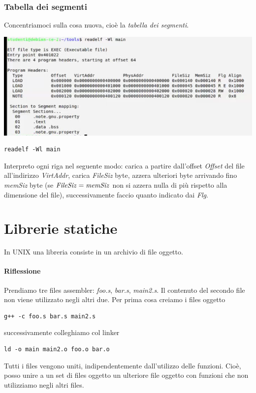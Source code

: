 \documentclass[11pt]{report}
\theoremstyle{definition}
\begin{document}
\subsubsection{Tabella dei segmenti} Concentriamoci sulla cosa nuova, cioè la \emph{tabella dei segmenti}. \begin{center}
\includegraphics{img/60.PNG}
\end{center}  
\begin{verbatim}
readelf -Wl main
\end{verbatim}
Interpreto ogni riga nel seguente modo: carica a partire dall'offset \emph{Offset} del file all'indirizzo \emph{VirtAddr}, carica \emph{FileSiz} byte, azzera ulteriori byte arrivando fino \emph{memSiz} byte (se $\text{\emph{FileSiz}} = \text{\emph{memSiz}}$ non si azzera nulla di più rispetto alla dimensione del file), successivamente faccio quanto indicato dai \emph{Flg}.

\section{Librerie statiche}
In UNIX una libreria consiste in un archivio di file oggetto.
\paragraph{Riflessione} Prendiamo tre files assembler: \emph{foo.s}, \emph{bar.s}, \emph{main2.s}. Il contenuto del secondo file non viene utilizzato negli altri due. Per prima cosa creiamo i files oggetto
\begin{verbatim}
g++ -c foo.s bar.s main2.s
\end{verbatim}
successivamente colleghiamo col linker
\begin{verbatim}
ld -o main main2.o foo.o bar.o
\end{verbatim}
Tutti i files vengono uniti, indipendentemente dall'utilizzo delle funzioni. Cioè, posso unire a un set di files oggetto un ulteriore file oggetto con funzioni che non utilizziamo negli altri files.
\end{document}
